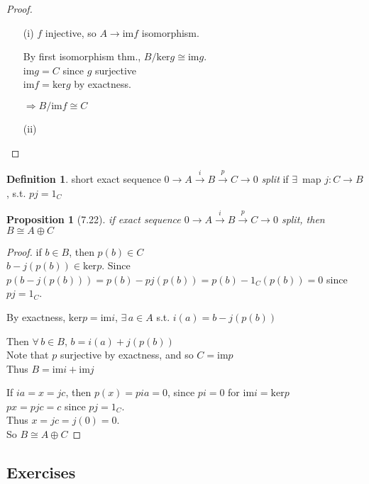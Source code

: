 \documentclass[twoside,landscape]{amsart}
\theoremstyle{plain}
\newtheorem{proposition}{Proposition}
\theoremstyle{definition}
\newtheorem{definition}{Definition}
\theoremstyle{remark}
\begin{document}
\begin{multicols*}{2}
\begin{proof}
  \begin{enumerate}
    \item[(i)] $f$ injective, so $A \to \text{im}f$ isomorphism.  

By first isomorphism thm., $B/\text{ker}g \cong \text{im}g$.  \\
$\text{im}g = C$ since $g$ surjective \\
$\text{im}f = \text{ker}g$ by exactness.  

$\Longrightarrow B/\text{im}f \cong C$  
\item[(ii)]
\end{enumerate}
\end{proof}

\begin{definition}
  short exact sequence $0 \to A \xrightarrow{i} B \xrightarrow{p} C \to 0$ \emph{split} if $\exists \, $ map $j: C \to B$, s.t. $pj=1_C$
\end{definition}

\begin{proposition}[7.22]
  if exact sequence $0 \to A \xrightarrow{i} B \xrightarrow{p} C \to 0$ split, then $B \cong A \oplus C$  
\end{proposition}

\begin{proof}
  if $b \in B$, then $p(b) \in C$ \\
$b - j(p(b)) \in \text{ker}p$.  Since $p(b-j(p(b))) = p(b) - pj(p(b)) = p(b) -1_C(p(b)) = 0$ since $pj=1_C$.  

By exactness, $\text{ker}p = \text{im}i$, $\exists \, a \in A$ s.t. $i(a) = b-j(p(b))$

Then $\forall \, b \in B$, $b=i(a) + j(p(b))$ \\
\phantom{Then} Note that $p$ surjective by exactness, and so $C = \text{im}p$ \\
Thus $B = \text{im}i + \text{im}j$

If $ia=x=jc$, then $p(x) = pia=0$, since $pi =0$ for $\text{im}i = \text{ker}p$ \\
\phantom{if} $px=pjc =c$ since $pj=1_C$.  \\
Thus $x=jc = j(0) =0$.  \\
So $B \cong A\oplus C$
\end{proof}

\subsection*{Exercises}


\end{multicols*}
\end{document}
